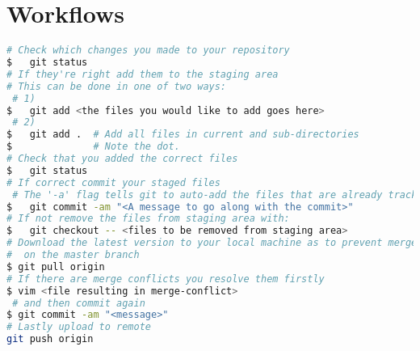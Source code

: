 \documentclass[11pt,a4paper,oneside,final,titlepage]{article}
\begin{document}
\section{Workflows}
\begin{lstlisting}[language=bash
                  ,label=lst:generalFlow
                  ,name=lst:generalFlow
                  ,caption=General workflow when working with git]
# Check which changes you made to your repository
$   git status
# If they're right add them to the staging area
# This can be done in one of two ways:
 # 1)
$   git add <the files you would like to add goes here>
 # 2)
$   git add .  # Add all files in current and sub-directories
$              # Note the dot.
# Check that you added the correct files
$   git status
# If correct commit your staged files
 # The '-a' flag tells git to auto-add the files that are already tracked by git
$   git commit -am "<A message to go along with the commit>"
# If not remove the files from staging area with:
$   git checkout -- <files to be removed from staging area>
# Download the latest version to your local machine as to prevent merge-conflicts
#  on the master branch
$ git pull origin
# If there are merge conflicts you resolve them firstly
$ vim <file resulting in merge-conflict>
 # and then commit again
$ git commit -am "<message>"
# Lastly upload to remote
git push origin
\end{lstlisting}
\end{document}
